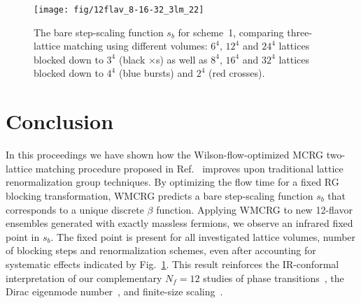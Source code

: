 \documentclass{PoS}
\newcommand{\be}{\ensuremath{\beta} }
\newcommand{\fig}[1]{Fig.~\ref{#1}}
\newcommand{\refcite}[1]{Ref.~\cite{#1}}
\begin{document}
\begin{figure}[th]
  \centering
  \texttt{[image: fig/12flav\_8-16-32\_3lm\_22]}
  \caption{The bare step-scaling function $s_b$ for scheme~1, comparing three-lattice matching using different volumes: $6^4$, $12^4$ and $24^4$ lattices blocked down to $3^4$ (black $\times$s) as well as $8^4$, $16^4$ and $32^4$ lattices blocked down to $4^4$ (blue bursts) and $2^4$ (red crosses).}
  \label{fig:scheme1}
\end{figure}



\section{Conclusion} %
In this proceedings we have shown how the Wilson-flow-optimized MCRG two-lattice matching procedure proposed in \refcite{Petropoulos:2012mg} improves upon traditional lattice renormalization group techniques.
By optimizing the flow time for a fixed RG blocking transformation, WMCRG predicts a bare step-scaling function $s_b$ that corresponds to a unique discrete \be function.
Applying WMCRG to new 12-flavor ensembles generated with exactly massless fermions, we observe an infrared fixed point in $s_b$.
The fixed point is present for all investigated lattice volumes, number of blocking steps and renormalization schemes, even after accounting for systematic effects indicated by \fig{fig:scheme1}.
This result reinforces the IR-conformal interpretation of our complementary $N_f = 12$ studies of phase transitions~\cite{Schaich:2012fr, Hasenfratz:2013uha}, the Dirac eigenmode number~\cite{Cheng:2013eu, Cheng:2013bca}, and finite-size scaling~\cite{Hasenfratz:2013eka}.



\end{document}
